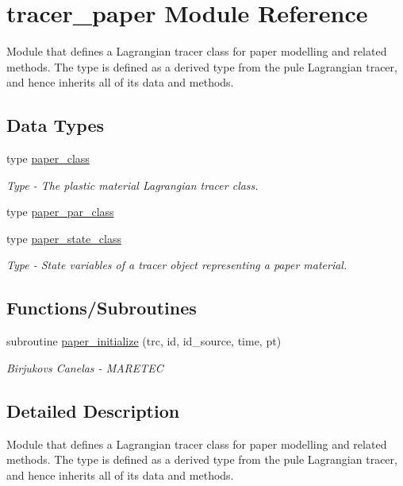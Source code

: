 \hypertarget{namespacetracer__paper}{}\section{tracer\+\_\+paper Module Reference}
\label{namespacetracer__paper}


Module that defines a Lagrangian tracer class for paper modelling and related methods. The type is defined as a derived type from the pule Lagrangian tracer, and hence inherits all of it\textquotesingle{}s data and methods.  


\subsection*{Data Types}
\begin{DoxyCompactItemize}
\item 
type \hyperlink{structtracer__paper_1_1paper__class}{paper\+\_\+class}
\begin{DoxyCompactList}\small\item\em Type -\/ The plastic material Lagrangian tracer class. \end{DoxyCompactList}\item 
type \hyperlink{structtracer__paper_1_1paper__par__class}{paper\+\_\+par\+\_\+class}
\item 
type \hyperlink{structtracer__paper_1_1paper__state__class}{paper\+\_\+state\+\_\+class}
\begin{DoxyCompactList}\small\item\em Type -\/ State variables of a tracer object representing a paper material. \end{DoxyCompactList}\end{DoxyCompactItemize}
\subsection*{Functions/\+Subroutines}
\begin{DoxyCompactItemize}
\item 
subroutine \hyperlink{namespacetracer__paper_aad494497e50de353bb7458cc82fd617d}{paper\+\_\+initialize} (trc, id, id\+\_\+source, time, pt)
\begin{DoxyCompactList}\small\item\em Birjukovs Canelas -\/ M\+A\+R\+E\+T\+EC \end{DoxyCompactList}\end{DoxyCompactItemize}


\subsection{Detailed Description}
Module that defines a Lagrangian tracer class for paper modelling and related methods. The type is defined as a derived type from the pule Lagrangian tracer, and hence inherits all of it\textquotesingle{}s data and methods. 

